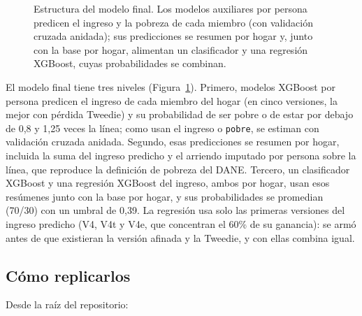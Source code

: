 \documentclass[12pt]{article}
\begin{document}
\begin{figure}[H]
{}
\caption{Estructura del modelo final. Los modelos auxiliares por persona
  predicen el ingreso y la pobreza de cada miembro (con validación cruzada
  anidada); sus predicciones se resumen por hogar y, junto con la base por
  hogar, alimentan un clasificador y una regresión XGBoost, cuyas
  probabilidades se combinan.}
\label{fig:estructura}
\end{figure}

El modelo final tiene tres niveles (Figura~\ref{fig:estructura}). Primero,
modelos XGBoost por persona predicen el ingreso de cada miembro del hogar (en
cinco versiones, la mejor con pérdida Tweedie) y su probabilidad de ser pobre
o de estar por debajo de 0,8 y 1,25 veces la línea; como usan el ingreso o
\texttt{pobre}, se estiman con validación cruzada anidada. Segundo, esas
predicciones se resumen por hogar, incluida la suma del ingreso predicho y el
arriendo imputado por persona sobre la línea, que reproduce la definición de
pobreza del DANE. Tercero, un clasificador XGBoost y una regresión XGBoost del
ingreso, ambos por hogar, usan esos resúmenes junto con la base por hogar, y
sus probabilidades se promedian (70/30) con un umbral de 0,39. La regresión
usa solo las primeras versiones del ingreso predicho (V4, V4t y V4e, que
concentran el 60\% de su ganancia): se armó antes de que existieran la
versión afinada y la Tweedie, y con ellas combina igual.

\subsection{Cómo replicarlos}

Desde la raíz del repositorio:
\end{document}
